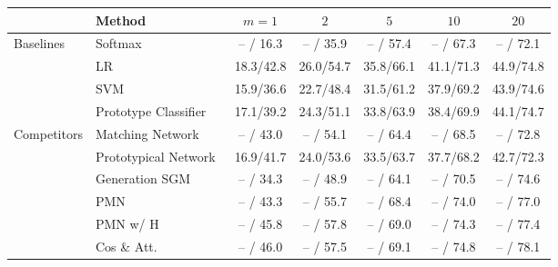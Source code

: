 \documentclass[10pt,letterpaper,twocolumn]{article}
\providecommand{\tabularnewline}{\\}
\begin{document}
\begin{table*}
\begin{centering}
\begin{tabular}{llccccc}
\hline 
 & {\small{}{}{}{}{}{}Method } & {\small{}{}{}{}{}{}$m=1$  } & {\small{}{}{}{}{}{}$2$  } & {\small{}{}{}{}{}{}$5$  } & {\small{}{}{}{}{}{}$10$  } & {\small{}{}{}{}{}{}$20$}\tabularnewline
\hline 
\hline 
\multirow{4}{*}{{\small{}Baselines }} & {\small{}{}{}{}{}{}Softmax  } & {\small{}{}{}{}{}{}-- / 16.3  } & {\small{}{}{}{}{}{}-- / 35.9  } & {\small{}{}{}{}{}{}-- / 57.4  } & {\small{}{}{}{}{}{}-- / 67.3  } & {\small{}{}{}{}{}{}-- / 72.1}\tabularnewline
 & {\small{}{}{}{}{}{}LR  } & {\small{}18.3{}/42.8  } & {\small{}{}{}{}{}{}{}26.0{}/54.7  } & {\small{}{}{}{}{}{}{}35.8{}/66.1  } & {\small{}{}{}{}{}{}{}41.1{}/71.3  } & {\small{}{}{}{}{}{}{}44.9{}/74.8 }\tabularnewline
 & {\small{}{}{}{}{}{}SVM  } & {\small{}{}{}{}{}{}15.9/36.6  } & {\small{}{}{}{}{}{}22.7/48.4  } & {\small{}{}{}{}{}{}31.5/61.2  } & {\small{}{}{}{}{}{}37.9/69.2  } & {\small{}{}{}{}{}{}43.9/74.6}\tabularnewline
 & {\small{}{}{}{}{}{}Prototype Classifier  } & {\small{}{}{}{}{}{}17.1/39.2  } & {\small{}{}{}{}{}{}24.3/51.1  } & {\small{}{}{}{}{}{}33.8/63.9  } & {\small{}{}{}{}{}{}38.4/69.9  } & {\small{}{}{}{}{}{}44.1/74.7 }\tabularnewline
\hline 
\hline 
\multirow{7}{*}{{\small{}Competitors }} 
& {\small{}{}{}{}{}{}Matching Network~\cite{matchingnet_1shot}
 } & {\small{}{}{}{}{}{}-- / 43.0  } & {\small{}{}{}{}{}{}-- / 54.1  } & {\small{}{}{}{}{}-- / 64.4  } & {\small{}{}{}{}{}{}-- / 68.5  } & {\small{}{}{}{}{}{}-- / 72.8 }\tabularnewline
 & {\small{}{}{}Prototypical Network~\cite{prototype_network} } & {\small{}{}{}{}{}{}16.9/41.7  } & {\small{}{}{}{}{}{}24.0/53.6  } & {\small{}{}{}{}{}{}33.5/63.7  } & {\small{}{}{}{}{}{}37.7/68.2  } & {\small{}{}{}{}{}{}42.7/72.3}\tabularnewline
 & {\small{}{}{}{}{}{}Generation SGM~\cite{2017ICCVaug} } & {\small{}{}{}{}{}{}-- / 34.3  } & {\small{}{}{}{}{}{}-- / 48.9  } & {\small{}{}{}{}{}{}-- / 64.1  } & {\small{}{}{}{}{}{}-- / 70.5  } & {\small{}{}{}{}{}{}-- / 74.6}\tabularnewline
 & {\small{}{}{}PMN~\cite{imaginaryData} } & {\small{}{}{}-- / 43.3  } & {\small{}{}{}-- / 55.7  } & {\small{}{}{}-- / 68.4  } & {\small{}{}{}-- / 74.0  } & {\small{}{}{}-- / 77.0}\tabularnewline
 & {\small{}{}{}PMN w/ H~\cite{imaginaryData} } & {\small{}{}{}-- / 45.8  } & {\small{}{}{}-- / 57.8  } & {\small{}{}{}-- / 69.0  } & {\small{}{}{}-- / 74.3  } & {\small{}{}{}-- / 77.4}\tabularnewline
 & {\small{}{}{}Cos \& Att.~\cite{dym} } & {\small{}{}{}-- / 46.0  } & {\small{}{}{}-- / 57.5  } & {\small{}{}{}-- / 69.1  } & {\small{}{}{}-- / 74.8}{\small{}{}  } & {\small{}{}{}-- / 78.1}\tabularnewline

\end{tabular}
\end{centering}
\end{table*}
\end{document}
